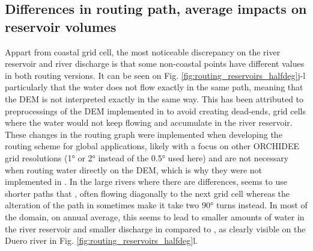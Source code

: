 \subsection{Differences in routing path, average impacts on reservoir volumes}
Appart from coastal grid cell, the most noticeable discrepancy on the river reservoir and river discharge is that some non-coastal points have different values in both routing versions. It can be seen on Fig. \ref{fig:routing_reservoirs_halfdeg}j-l particularly that the water does not flow exactly in the same path, meaning that the DEM is not interpreted exactly in the same way. This has been attributed to preprocessings of the DEM implemented in \std to avoid creating dead-ends, grid cells where the water would not keep flowing and accumulate in the river reservoir. These changes in the routing graph were implemented when developing the routing scheme for global applications, likely with a focus on other ORCHIDEE grid resolutions (1° or 2° instead of the 0.5° used here) and are not necessary when routing water directly on the DEM, which is why they were not implemented in \native. In the large rivers where there are differences, \native seems to use shorter paths that \std, often flowing diagonally to the next grid cell whereas the alteration of the path in \std sometimes make it take two 90° turns instead. In most of the domain, on annual average, this seems to lead to smaller amounts of water in the river reservoir and smaller discharge in \native compared to \std, as clearly visible on the Duero river in Fig. \ref{fig:routing_reservoirs_halfdeg}l.

